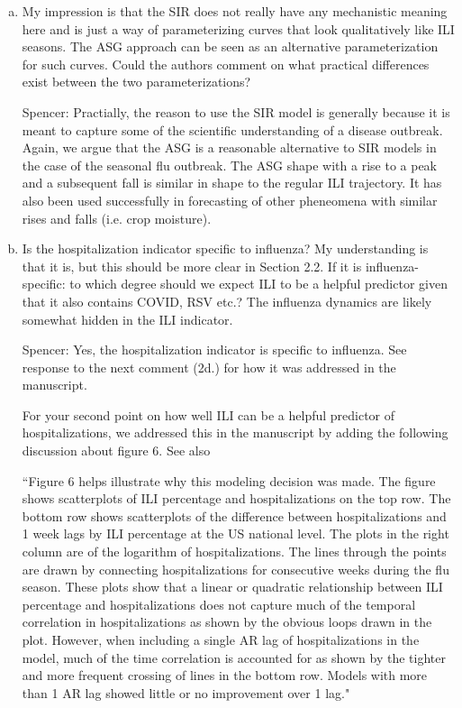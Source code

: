 \documentclass{article}
\newcommand{\spencer}[1]{{\color{blue} Spencer: #1}}
\begin{document}
\begin{enumerate}[1.]
\begin{enumerate}[a.]
{We cite Osthus et al. 2019, who also touch on this.}


\item My impression is that the SIR does not really have any mechanistic meaning here and is just a
way of parameterizing curves that look qualitatively like ILI seasons. The ASG approach can be
seen as an alternative parameterization for such curves. Could the authors comment on what
practical differences exist between the two parameterizations?

\spencer{Practially, the reason to use the SIR model is generally because it is meant
to capture some of the scientific understanding of a disease outbreak. Again, we argue 
that the ASG is a reasonable alternative to SIR models in the case of the seasonal flu
outbreak. The ASG shape with a rise to a peak and a subsequent fall is similar in shape
to the regular ILI trajectory. It has also been used successfully in forecasting of 
other pheneomena with similar rises and falls (i.e. crop moisture)}.



\item Is the hospitalization indicator specific to influenza? My understanding is that it is, but this
should be more clear in Section 2.2. If it is influenza-specific: to which degree should we expect ILI
to be a helpful predictor given that it also contains COVID, RSV etc.? The influenza dynamics are
likely somewhat hidden in the ILI indicator.

\spencer{Yes, the hospitalization indicator is specific to influenza. See 
response to the next comment (2d.) for how it was addressed in the manuscript. 

For your second point on how well ILI can be a helpful predictor of hospitalizations,
we addressed this in the manuscript by adding the following discussion about
figure 6. See also 


``Figure 6 helps
illustrate why this modeling decision was made.
The figure shows scatterplots of ILI percentage and 
hospitalizations on the top row.
The bottom row shows scatterplots of the difference between hospitalizations and 
1 week lags
by ILI percentage at the US national level. The plots in the right column
are of the logarithm of hospitalizations. The lines through the points are
drawn by connecting hospitalizations for consecutive weeks during the flu 
season.
These plots show that a linear or quadratic relationship between ILI percentage 
and hospitalizations does not capture much of the temporal correlation in 
hospitalizations as shown by the obvious loops drawn in the plot. 
However, when including a 
single AR lag of hospitalizations in the model, much of the time 
correlation is
accounted for as shown by the tighter and more frequent crossing of lines
in the bottom row. Models with more than 1 AR lag showed little or no 
improvement over 1 lag."}





\end{enumerate}
\end{enumerate}
\end{document}
